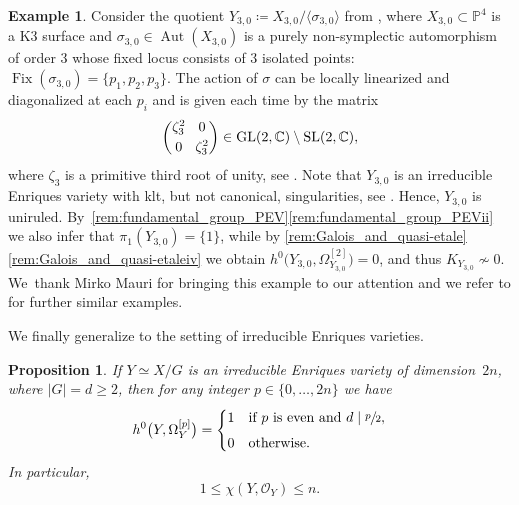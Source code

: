 \documentclass[10pt]{amsart}
\theoremstyle{plain}
\newtheorem{prop}[thm]{Proposition}
\theoremstyle{definition}
\newtheorem{exa}[thm]{Example}
\newcommand{\C}{\mathbb{C}}
\renewcommand{\P}{\mathbb{P}}
\newcommand{\OO}{\mathcal{O}}
\DeclareMathOperator{\Aut}{Aut}
\DeclareMathOperator{\Fix}{Fix}
\DeclareMathOperator{\GL}{GL}
\DeclareMathOperator{\SL}{SL}
\begin{document}
\begin{exa}
\label{example:uniruled_Enriques}
Consider the quotient $Y_{3,0} \coloneqq X_{3,0} / \langle \sigma_{3,0} \rangle$ from \cite[Prop.\,4.7]{AS08}, where $X_{3,0} \subset \P^4$ is a K3 surface and $\sigma_{3,0} \in \Aut(X_{3,0})$ is a purely non-symplectic automorphism of order $3$ whose fixed locus consists of $3$ isolated points:
$ \Fix(\sigma_{3,0}) = \{ p_1, p_2, p_3 \} $. The action of $\sigma$ can be locally linearized and diagonalized at each $p_i$ and is given each time by the matrix
\[\arraycolsep3.5pt
\begin{pmatrix}
\zeta_3^2 & 0 \\[0.25em]
0 & \zeta_3^2
\end{pmatrix}
\in \GL(2,\C) \setminus \SL(2,\C),
\]
where $\zeta_3$ is a primitive third root of unity, see \cite[\S 2]{AS08}.
Note that $Y_{3,0}$ is an irreducible Enriques variety with klt, but not canonical, singularities, see \cite[Prop.\,4.18, Th.\,4.20 and Rem.\,4.21(1)]{KM98}. Hence, $Y_{3,0}$ is uniruled. By~\autoref{rem:fundamental_group_PEV}\eqref{rem:fundamental_group_PEVii} we also infer that $\pi_1 (Y_{3,0}) = \{ 1 \}$, while by \autoref{rem:Galois_and_quasi-etale}\eqref{rem:Galois_and_quasi-etaleiv} we obtain
\hbox{$h^0 \bigl(Y_{3,0},\Omega_{Y_{3,0}}^{[2]} \bigr) \!=\! 0$}, and thus $K_{Y_{3,0}} \not\sim 0$. We~thank Mirko Mauri for bringing this example to our attention and we refer to \cite{AST11,BrandhorstHofmann23} for further similar examples.
\end{exa}

We finally generalize \cite[Prop.\,2.6]{OS11a} to the setting of irreducible Enriques varieties.

\begin{prop}
\label{prop:algebra_reflexive_forms_IEV}
If $Y \simeq X / G$ is an irreducible Enriques variety of dimension~$2n$, where $|G| = d \geq 2$, then for any integer $ p \in \{ 0, \dots, 2n \}$ we have
\[
h^0 \bigl(Y, \Omega_Y^{[p]} \bigr) =
\begin{cases}
1 & \text{if } p \text{ is even and } d \mid \sfrac{p}{2}, \\[0.4em]
0 & \text{otherwise}.
\end{cases}
\]
In particular,
\[
1 \leq \chi(Y, \OO_Y) \leq n.
\]
\end{prop}
\end{document}
